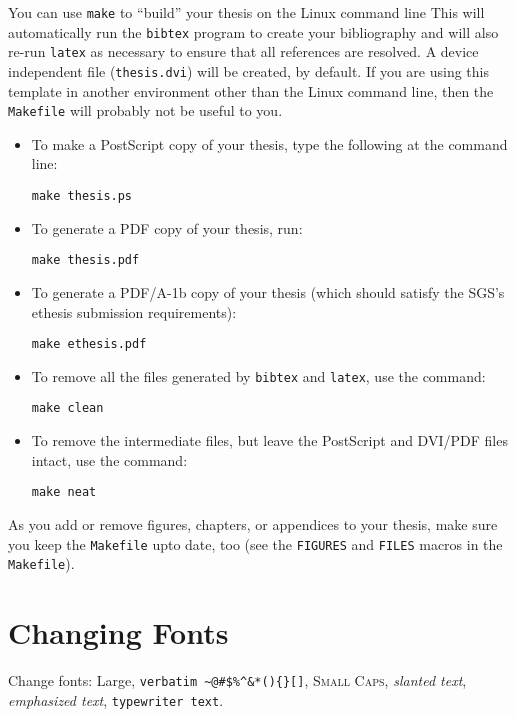 You can use \texttt{make} to ``build'' your thesis on the Linux command
line This will
automatically run the \texttt{bibtex} program to create your bibliography
and will also re-run \texttt{latex} as necessary to ensure that all
references are resolved.  A device independent file (\texttt{thesis.dvi})
will be created, by default.  If you are using this template in another
environment other than the Linux command line, then the \texttt{Makefile}
will probably not be useful to you.

\begin{itemize}
\item To make a PostScript copy of your thesis, type the following
at the command line:

\texttt{make thesis.ps}

\item To generate a PDF copy of your thesis, run:

\texttt{make thesis.pdf}

\item To generate a PDF/A-1b copy of your thesis (which should
satisfy the SGS's ethesis submission requirements):

\texttt{make ethesis.pdf}

\item To remove all the files generated by \texttt{bibtex} and
\texttt{latex}, use the command:

\texttt{make clean}

\item To remove the intermediate files, but leave the PostScript
and DVI/PDF files intact, use the command:

\texttt{make neat}
\end{itemize}

As you add or remove figures, chapters, or appendices to your thesis,
make sure you keep the \texttt{Makefile} upto date, too (see the
\texttt{FIGURES} and \texttt{FILES} macros in the \texttt{Makefile}).

\section{Changing Fonts}

Change fonts: {\Large Large},
\verb+verbatim ~@#$%^&*(){}[]+,
\textsc{Small Caps},
\textsl{slanted text},
\emph{emphasized text},
\texttt{typewriter text}.

